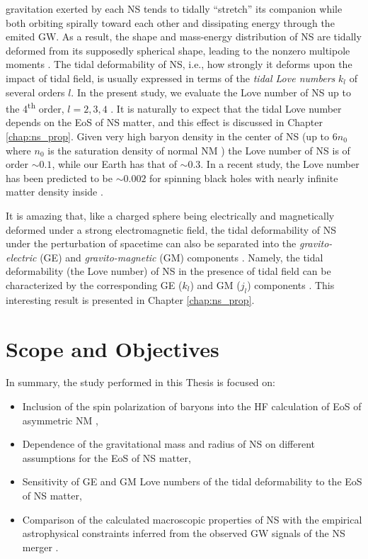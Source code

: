 gravitation exerted by each \gls{NS} tends to tidally ``stretch'' its companion while 
both orbiting spirally toward each other and dissipating energy through the emited 
\gls{GW}. As a result, the shape and mass-energy
distribution of \gls{NS} are tidally deformed from its supposedly spherical shape, 
leading to the nonzero multipole moments 
\citep{hinderer2008tidal,hinderer2010tidal,damour2009relativistic}. The tidal 
deformability of \gls{NS}, i.e., how strongly it deforms upon the impact of tidal field, 
is usually expressed in terms of the \emph{tidal Love numbers} $k_l$ of several orders 
$l$. In the present study, we evaluate the Love number of \gls{NS} 
up to the 4\textsuperscript{th} order, $l=2,3,4$ \citep{perot2021role}. It is naturally
to expect that the tidal Love number depends on the \gls{EoS} of NS matter, and this 
effect is discussed in Chapter \ref{chap:ns_prop}. Given very high baryon density in the
center of \gls{NS} (up to $6n_0$ where $n_0$ is the saturation density of normal NM ) 
the Love number of NS is of order $\sim 0.1$, while our Earth has that of $\sim 0.3$. 
In a recent study, the Love number has been predicted to be $\sim 0.002$ for spinning 
black holes with nearly infinite matter density inside \citep{le2021spinning}.

It is amazing that, like a charged sphere being electrically and magnetically deformed 
under a strong electromagnetic field, the tidal deformability of NS under the perturbation 
of spacetime can also be separated into the \emph{gravito-electric} (\gls{GE}) 
and \emph{gravito-magnetic} (\gls{GM}) components \citep{damour2009relativistic}. 
Namely, the tidal deformability (the Love number) of \gls{NS}  in the presence of tidal 
field can be characterized by the corresponding \gls{GE} ($k_l$) and \gls{GM} ($j_l$) 
components \citep{perot2021role}. This interesting result is presented in 
Chapter \ref{chap:ns_prop}.

\section*{Scope and Objectives}%
\label{sec:scope_and_objectives}

In summary, the study performed in this Thesis is focused on:
\begin{itemize}
        \item Inclusion of the spin polarization of baryons into the HF calculation
				of EoS of asymmetric NM \citep{tan2021equation},
        \item Dependence of the gravitational mass and radius of \gls{NS} on 
				different assumptions for the \gls{EoS} of NS matter,
        \item Sensitivity of \gls{GE} and \gls{GM} Love numbers of the tidal deformability 
				to the EoS of NS matter,
        \item Comparison of the calculated macroscopic properties of NS with the empirical
				astrophysical constraints inferred from the observed GW signals of the NS merger 
				\citep{abbott2018gw170817,xie2019bayesian}.
\end{itemize}
